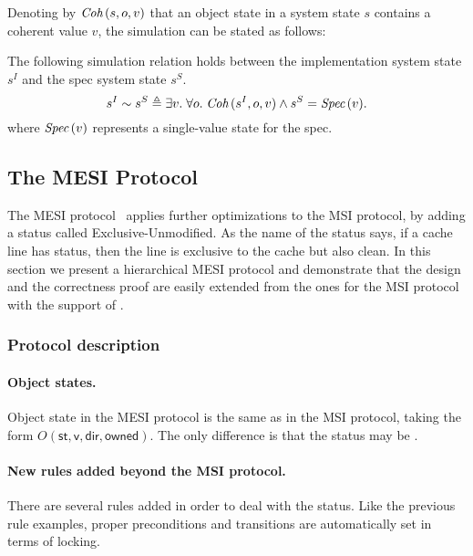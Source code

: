\documentclass[sigplan,10pt,review,anonymous,screen]{acmart}\settopmatter{printfolios=true,printccs=false,printacmref=false}
\begin{document}
Denoting by $\textit{Coh}\,(s, o, v)$ that an object state in a system state $s$ contains a coherent value $v$, the simulation can be stated as follows:
\begin{theorem}
  The following simulation relation holds between the implementation system state $s^I$ and the spec system state $s^S$.
  \begin{displaymath}
    s^I \sim s^S \triangleq \exists v.\; \forall o.\; \textit{Coh}\,(s^I, o, v) \wedge s^S = \textit{Spec}\,(v).
  \end{displaymath}
  where $\textit{Spec}\,(v)$ represents a single-value state for the spec.
  \label{thm-msi-correct}
\end{theorem}

\subsection{The MESI Protocol}
\label{sec-mesi-protocol}

The MESI protocol~\cite{Papamarcos:1984} applies further optimizations to the MSI protocol, by adding a status called Exclusive-Unmodified.
As the name of the status says, if a cache line has \stE{} status, then the line is exclusive to the cache but also clean.
In this section we present a hierarchical MESI protocol and demonstrate that the design and the correctness proof are easily extended from the ones for the MSI protocol with the support of \hemiola{}.

\subsubsection{Protocol description}

\paragraph{Object states.}
Object state in the MESI protocol is the same as in the MSI protocol, taking the form $O(\textsf{st}, \textsf{v}, \textsf{dir}, \textsf{owned})$.
The only difference is that the status may be \stE{}.

\paragraph{New rules added beyond the MSI protocol.}
There are several rules added in order to deal with the \stE{} status.
Like the previous rule examples, proper preconditions and transitions are automatically set in terms of locking.
\end{document}
